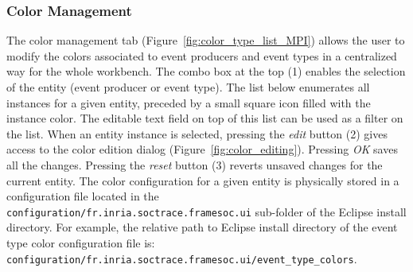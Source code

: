 \documentclass[twoside]{article}
\begin{document}
\begin{sloppypar}
\subsubsection{Color Management}
\label{subsec:colors}

The color management tab (Figure~\ref{fig:color_type_list_MPI}) allows the user to modify the colors associated to event producers and event types in a centralized way for the whole workbench.
The combo box at the top (\num{1}) enables the selection of the entity (event producer or event type).
The list below enumerates all instances for a given entity, preceded by a small square icon filled with the instance color.
The editable text field on top of this list can be used as a filter on the list.
When an entity instance is selected, pressing the \emph{edit} button (\num{2}) gives access to the color edition dialog (Figure~\ref{fig:color_editing}).
Pressing \emph{OK} saves all the changes.
Pressing the \emph{reset} button (\num{3}) reverts unsaved changes for the current entity.
The color configuration for a given entity is physically stored in a configuration file located in the \texttt{configuration/fr.inria.soctrace.framesoc.ui} sub-folder of the Eclipse install directory.
For example, the relative path to Eclipse install directory of the event type color configuration file is:
\texttt{configuration/fr.inria.soctrace.framesoc.ui/event\_type\_colors}.


\end{sloppypar}
\end{document}

